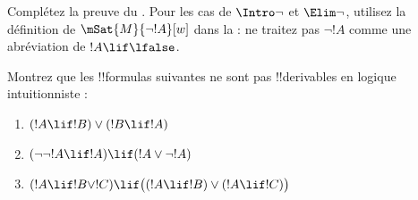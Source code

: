 \documentclass[../../../include/open-logic-section]{subfiles}
\begin{document}
\begin{prob}
  Complétez la preuve du . Pour les
  cas de $\Intro\lnot$ et $\Elim\lnot$, utilisez la définition de
  $\mSat{M}{\lnot !A}[w]$ dans la
   : ne traitez pas
  $\lnot !A$ comme une abréviation de $!A \lif \lfalse$.
\end{prob}

\begin{prob}
  Montrez que les !!{formula}s suivantes ne sont pas !!{derivable}s
  en logique intuitionniste :
  \begin{enumerate}
    \item $(!A \lif !B) \lor (!B \lif !A)$
    \item $(\lnot\lnot !A \lif !A) \lif (!A \lor \lnot !A)$
    \item $(!A \lif !B \lor !C) \lif \bigl((!A \lif !B)\lor(!A \lif !C)\bigr)$
  \end{enumerate}
\end{prob}
\end{document}
